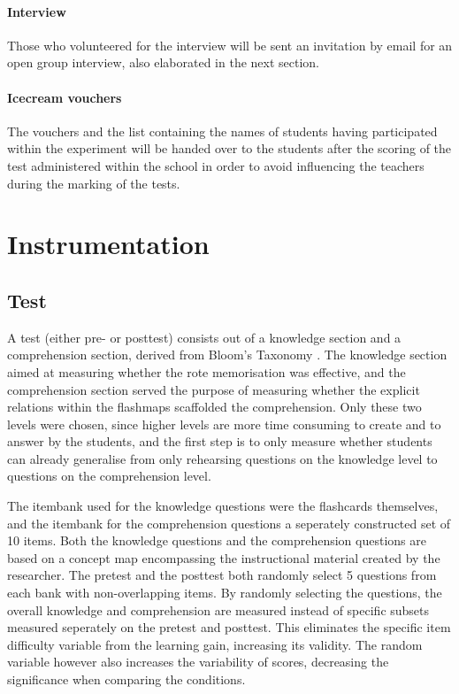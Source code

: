 \paragraph{Interview} Those who volunteered for the interview will be sent an invitation by email for an open group interview, also elaborated in the next section.

\paragraph{Icecream vouchers} The vouchers and the list containing the names of students having participated within the experiment will be handed over to the students after the scoring of the test administered within the school in order to avoid influencing the teachers during the marking of the tests.

\section{Instrumentation}
\label{sec:instrumentation}

\subsection{Test}

A test (either pre- or posttest) consists out of a knowledge section and a comprehension section, derived from Bloom's Taxonomy \cite{bloom}. The knowledge section aimed at measuring whether the rote memorisation was effective, and the comprehension section served the purpose of measuring whether the explicit relations within the flashmaps scaffolded the comprehension. Only these two levels were chosen, since higher levels are more time consuming to create and to answer by the students, and the first step is to only measure whether students can already generalise from only rehearsing questions on the knowledge level to questions on the comprehension level.

The itembank used for the knowledge questions were the flashcards themselves, and the itembank for the comprehension questions a seperately constructed set of 10 items. Both the knowledge questions and the comprehension questions are based on a concept map encompassing the instructional material created by the researcher. The pretest and the posttest both randomly select 5 questions from each bank with non-overlapping items. By randomly selecting the questions, the overall knowledge and comprehension are measured instead of specific subsets measured seperately on the pretest and posttest. This eliminates the specific item difficulty variable from the learning gain, increasing its validity. The random variable however also increases the variability of scores, decreasing the significance when comparing the conditions.

